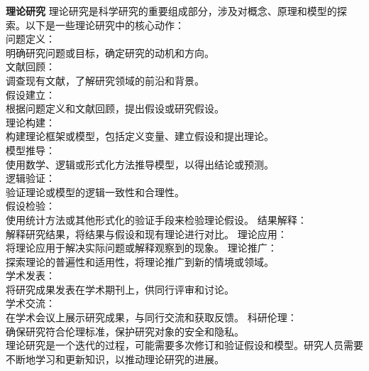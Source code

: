 \documentclass[12pt]{book}
\begin{document}
\textbf{理论研究}
理论研究是科学研究的重要组成部分，涉及对概念、原理和模型的探索。以下是一些理论研究中的核心动作：\\
问题定义：\\
明确研究问题或目标，确定研究的动机和方向。\\
文献回顾：\\
调查现有文献，了解研究领域的前沿和背景。\\
假设建立：\\
根据问题定义和文献回顾，提出假设或研究假设。\\
理论构建：\\
构建理论框架或模型，包括定义变量、建立假设和提出理论。\\
模型推导：\\
使用数学、逻辑或形式化方法推导模型，以得出结论或预测。\\
逻辑验证：\\
验证理论或模型的逻辑一致性和合理性。\\
假设检验：\\
使用统计方法或其他形式化的验证手段来检验理论假设。
结果解释：\\
解释研究结果，将结果与假设和现有理论进行对比。
理论应用：\\
将理论应用于解决实际问题或解释观察到的现象。
理论推广：\\
探索理论的普遍性和适用性，将理论推广到新的情境或领域。\\
学术发表：\\
将研究成果发表在学术期刊上，供同行评审和讨论。\\
学术交流：\\
在学术会议上展示研究成果，与同行交流和获取反馈。
科研伦理：\\
确保研究符合伦理标准，保护研究对象的安全和隐私。\\
理论研究是一个迭代的过程，可能需要多次修订和验证假设和模型。研究人员需要不断地学习和更新知识，以推动理论研究的进展。\\
\end{document}
